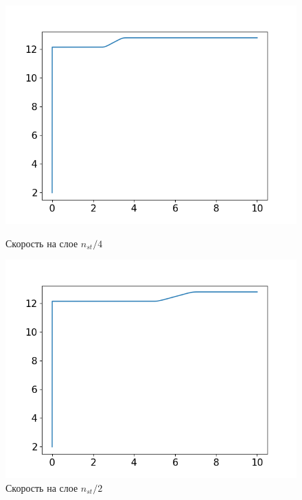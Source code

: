 \begin{figure}[h]
	\begin{minipage}[h]{0.47\linewidth}
		\centering
		\includegraphics[width=1\linewidth]{pics/task4/14u_2.png} 
		\caption{Скорость на слое $n_{st} / 4$}
	\end{minipage}
	\hfill
	\begin{minipage}[h]{0.47\linewidth}
		\centering
		\includegraphics[width=1\linewidth]{pics/task4/24u_2.png} 
		\caption{Скорость на слое $n_{st} / 2$}
	\end{minipage}
	\vfill
	\begin{minipage}[h]{0.47\linewidth}
		\centering

\end{minipage}
\end{figure}
